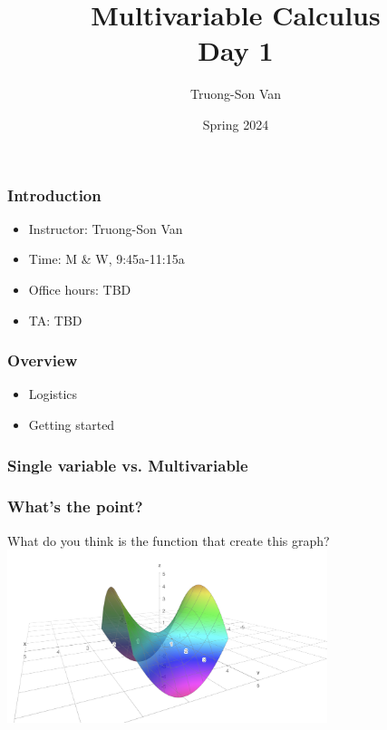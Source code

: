 \documentclass[aspectratio=169]{beamer}
\title{ Multivariable Calculus \\ Day 1}
\institute{Fulbright University Vietnam}
\author{Truong-Son Van}
\date{Spring 2024}
\begin{document}
\maketitle


\begin{frame}
    \frametitle{Introduction}
    \begin{itemize}
        \item Instructor: Truong-Son Van
        \item Time: M \& W, 9:45a-11:15a
        \item Office hours: TBD 
        \item TA:  TBD
    \end{itemize}
\end{frame}

\begin{frame}
    \frametitle{Overview}
    \begin{itemize}
        \item Logistics
        \item Getting started 
    \end{itemize}
\end{frame}

\begin{frame}
    \frametitle{Single variable vs. Multivariable}

\end{frame}

\begin{frame}
    \frametitle{What's the point?}
    What do you think is the function that create this graph?
    \centering
    \includegraphics[width=0.7\textwidth]{saddle}
\end{frame}
\end{document}
